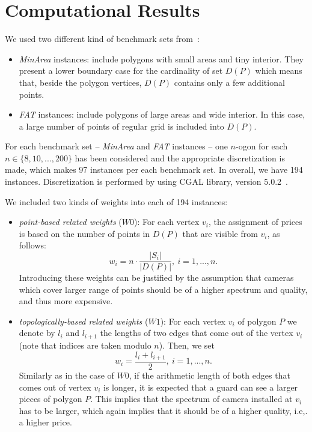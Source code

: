 \documentclass[runningheads,a4paper]{elsarticle}
\begin{document}
	\section{Computational Results}

 We used two different kind of benchmark sets from~\cite{bajuelos2004partitioning,tomas2006visibility}:
     \begin{itemize}
     	 \item \emph{MinArea} instances: include polygons with small areas and tiny interior. They present a lower boundary case for the cardinality of set $D(P)$ which means that, beside the polygon vertices,  $D(P)$ contains only a few additional points.
     	 \item \emph{FAT} instances:  include polygons of large areas and wide interior. In this case,  a large number of points of regular grid is included into $D(P)$.
     \end{itemize}
     For each benchmark set -- \emph{MinArea} and \emph{FAT} instances -- one $n$-ogon for each $n \in\{8,10,...,200\}$ has been considered and the appropriate discretization is made, which makes 97 instances per each benchmark set. In overall, we have 194 instances. Discretization is performed by using CGAL library, version 5.0.2~\cite{cgal:eb-20b}.

	We included two kinds of weights into each of 194  instances:
	\begin{itemize}
		\item \emph{point-based related weights} ($W0$): For each vertex $v_i$,  the assignment of prices is based on the number of points in $D(P)$ that are visible from $v_i$, as follows:
		\begin{equation}
		w_i = n \cdot \frac{|S_i|}{|D(P)|},\ i=1,...,n.
		\end{equation}
    Introducing these weights can be justified by the assumption that cameras which cover larger range of points should be of a higher spectrum and quality, and thus more expensive.
		\item \emph{topologically-based related weights} ($W1$): For each vertex $v_i$ of polygon $P$ we denote by $l_i$ and $l_{i+1}$ the lengths of two edges that come out of the vertex $v_i$ (note that indices are taken modulo $n$). Then, we set
\begin{equation}
w_i = \frac{l_i + l_{i+1}}{2} ,\ i=1,...,n.
 \end{equation}
 Similarly as in the case of $W0$, if the arithmetic length of both edges that comes out of vertex $v_i$ is longer, it is expected that a guard can see a larger pieces of polygon $P$. This implies that the spectrum of camera installed at $v_i$ has to be larger, which again implies that it should be of a higher quality, i.e,. a higher price.

	\end{itemize}
\end{document}
